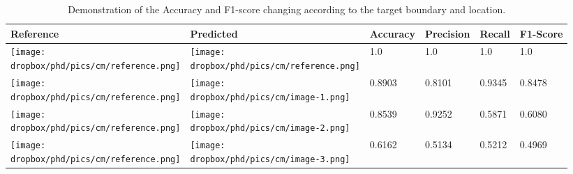 \begin{table}[H]
    \renewcommand{\arraystretch}{1.4}
    \caption{Demonstration of the Accuracy and F1-score changing according to the target boundary and location.}
    \scriptsize \centering
    \begin{tabular}{L{2cm}C{2cm}C{2cm}C{2cm}C{2cm}C{2cm}}
        \toprule
        \textbf{Reference} & \textbf{Predicted} & \textbf{Accuracy} & \textbf{Precision} & \textbf{Recall} & \textbf{F1-Score}\\ 
        \toprule
        \texttt{[image: \\dropbox/phd/pics/cm/reference.png]} & \texttt{[image: \\dropbox/phd/pics/cm/reference.png]} & 1.0 & 1.0 & 1.0 & 1.0 \\
        \texttt{[image: \\dropbox/phd/pics/cm/reference.png]} & \texttt{[image: \\dropbox/phd/pics/cm/image-1.png]} & 0.8903 & 0.8101 & 0.9345 & 0.8478 \\      
        \texttt{[image: \\dropbox/phd/pics/cm/reference.png]} & \texttt{[image: \\dropbox/phd/pics/cm/image-2.png]} & 0.8539 & 0.9252 & 0.5871 & 0.6080 \\      
        \texttt{[image: \\dropbox/phd/pics/cm/reference.png]} & \texttt{[image: \\dropbox/phd/pics/cm/image-3.png]} & 0.6162 & 0.5134 & 0.5212 & 0.4969 \\      
        \bottomrule
    \end{tabular}    
    \label{cm-synthetic-res}
\end{table}


